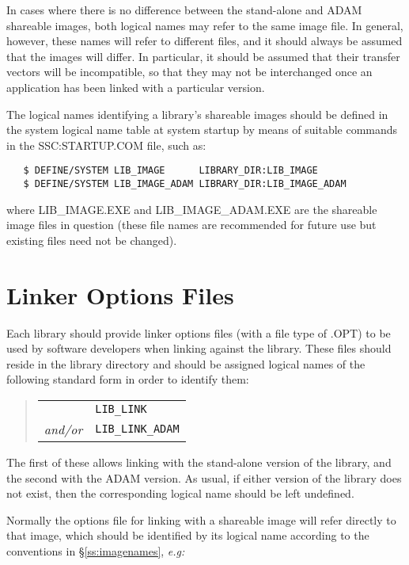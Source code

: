 In cases where there is no difference between the stand-alone and ADAM
shareable images, both logical names may refer to the same image file. 
In general, however, these names will refer to different files, and it
should always be assumed that the images will differ. 
In particular, it should be assumed that their transfer vectors will be
incompatible, so that they may not be interchanged once an application has
been linked with a particular version. 

The logical names identifying a library's shareable images should be defined
in the system logical name table at system startup by means of suitable
commands in the SSC:STARTUP.COM file, such as: 

\begin{verbatim}
   $ DEFINE/SYSTEM LIB_IMAGE      LIBRARY_DIR:LIB_IMAGE
   $ DEFINE/SYSTEM LIB_IMAGE_ADAM LIBRARY_DIR:LIB_IMAGE_ADAM
\end{verbatim}

where LIB\_IMAGE.EXE and LIB\_IMAGE\_ADAM.EXE are the shareable image files
in question (these file names are recommended for future use but existing
files need not be changed). 


\section{Linker Options Files}

Each library should provide linker options files (with a file type of .OPT) to
be used by software developers when linking against the library. 
These files should reside in the library directory and should be assigned
logical names of the following standard form in order to identify them: 

\begin{quote}
\begin{tabular}{rl}
& {\tt LIB\_LINK} \\
{\em and/or} & {\tt LIB\_LINK\_ADAM}
\end{tabular}
\end{quote}

The first of these allows linking with the stand-alone version of the
library, and the second with the ADAM version. 
As usual, if either version of the library does not exist, then the
corresponding logical name should be left undefined. 

Normally the options file for linking with a shareable image will refer
directly to that image, which should be identified by its logical name
according to the conventions in \S\ref{ss:imagenames}, {\em e.g:} 


